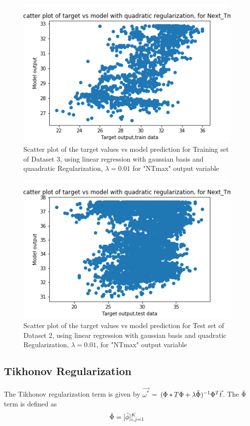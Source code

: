 \documentclass[12pt,a4paper]{article}
\begin{document}
\begin{figure}[H]
     \centering
     \includegraphics[scale=0.5]{images/scatter_ds3quadtrainT_max.png}
     \caption{Scatter plot of the target values vs model prediction for Training set of Dataset 3, using linear regression with gaussian basis and quaadratic Regularization, $\lambda = 0.01 $ for "NTmax" output variable}
     \label{fig:tikhds2tr}
\end{figure}
\begin{figure}[H]
     \centering
     \includegraphics[scale=0.5]{images/scatter_ds3quadtestT_max.png}
     \caption{Scatter plot of the target values vs model prediction for Test set of Dataset 2, using linear regression with gaussian basis and quadratic Regularization, $\lambda = 0.01$, for "NTmax" output variable}
     \label{fig:tikhds2tr}
\end{figure}

\subsection{Tikhonov Regularization} 
The Tikhonov regularization term is given by $\vec{\omega^*}$ = $(\Phi*T\Phi + \lambda \Tilde{\Phi})^{-1} \Phi^T \vec{t}$. The $\Tilde{\Phi}$ term is defined as 
\begin{equation}
    \Tilde{\Phi} = [\Tilde{\phi}]_{i,j = 1}^{K}
\end{equation}
\end{document}
